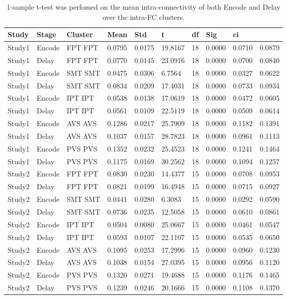 \begin{table}
\centering
\begin{tabular}[0.2em]{@{}llllllllll@{}}\toprule
Study & Stage & Cluster & Mean & Std & t & df & Sig & ci\\\toprule[0.2em]
Study1 & Encode & FPT FPT & 0.0795 & 0.0175 & 19.8167 & 18 & 0.0000 & 0.0710 & 0.0879 \\\midrule
Study1 & Delay & FPT FPT & 0.0770 & 0.0145 & 23.0916 & 18 & 0.0000 & 0.0700 & 0.0840 \\\midrule
Study1 & Encode & SMT SMT & 0.0475 & 0.0306 & 6.7564 & 18 & 0.0000 & 0.0327 & 0.0622 \\\midrule
Study1 & Delay & SMT SMT & 0.0834 & 0.0209 & 17.4031 & 18 & 0.0000 & 0.0733 & 0.0934 \\\midrule
Study1 & Encode & IPT IPT & 0.0538 & 0.0138 & 17.0619 & 18 & 0.0000 & 0.0472 & 0.0605 \\\midrule
Study1 & Delay & IPT IPT & 0.0561 & 0.0109 & 22.5119 & 18 & 0.0000 & 0.0509 & 0.0614 \\\midrule
Study1 & Encode & AVS AVS & 0.1286 & 0.0217 & 25.7909 & 18 & 0.0000 & 0.1182 & 0.1391 \\\midrule
Study1 & Delay & AVS AVS & 0.1037 & 0.0157 & 28.7823 & 18 & 0.0000 & 0.0961 & 0.1113 \\\midrule
Study1 & Encode & PVS PVS & 0.1352 & 0.0232 & 25.4523 & 18 & 0.0000 & 0.1241 & 0.1464 \\\midrule
Study1 & Delay & PVS PVS & 0.1175 & 0.0169 & 30.2562 & 18 & 0.0000 & 0.1094 & 0.1257 \\\midrule
Study2 & Encode & FPT FPT & 0.0830 & 0.0230 & 14.4377 & 15 & 0.0000 & 0.0708 & 0.0953 \\\midrule
Study2 & Delay & FPT FPT & 0.0821 & 0.0199 & 16.4948 & 15 & 0.0000 & 0.0715 & 0.0927 \\\midrule
Study2 & Encode & SMT SMT & 0.0441 & 0.0280 & 6.3083 & 15 & 0.0000 & 0.0292 & 0.0590 \\\midrule
Study2 & Delay & SMT SMT & 0.0736 & 0.0235 & 12.5058 & 15 & 0.0000 & 0.0610 & 0.0861 \\\midrule
Study2 & Encode & IPT IPT & 0.0504 & 0.0080 & 25.0667 & 15 & 0.0000 & 0.0461 & 0.0547 \\\midrule
Study2 & Delay & IPT IPT & 0.0593 & 0.0107 & 22.1107 & 15 & 0.0000 & 0.0535 & 0.0650 \\\midrule
Study2 & Encode & AVS AVS & 0.1095 & 0.0253 & 17.2996 & 15 & 0.0000 & 0.0960 & 0.1230 \\\midrule
Study2 & Delay & AVS AVS & 0.1038 & 0.0154 & 27.0395 & 15 & 0.0000 & 0.0956 & 0.1120 \\\midrule
Study2 & Encode & PVS PVS & 0.1320 & 0.0271 & 19.4688 & 15 & 0.0000 & 0.1176 & 0.1465 \\\midrule
Study2 & Delay & PVS PVS & 0.1239 & 0.0246 & 20.1666 & 15 & 0.0000 & 0.1108 & 0.1370 \\\bottomrule[0.2em]
\end{tabular}
\caption{1-sample t-test was perfomed on the mean intra-connectivity of both Encode and Delay over the intra-FC clusters.\label{tabel:GEMvsRestFC}}
\end{table}
